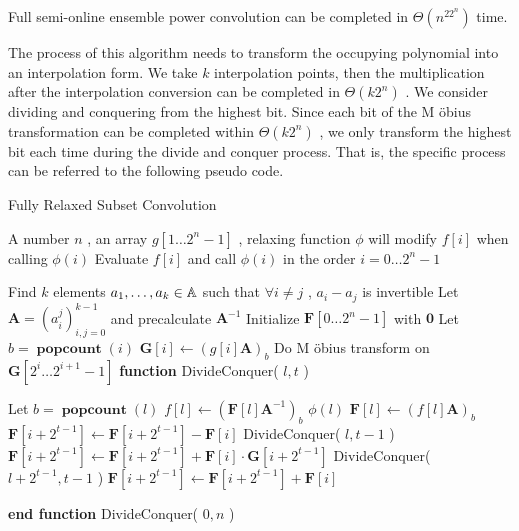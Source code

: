 {\begin { theorem }
Full semi-online ensemble power convolution can be completed in $ \Theta (n^ 22 ^n) $ time.
\end { theorem }

The process of this algorithm needs to transform the occupying polynomial into an interpolation form. We take $ k $ interpolation points, then the multiplication after the interpolation conversion can be completed in $ \Theta (k 2 ^n) $ . We consider dividing and conquering from the highest bit. Since each bit of the M \" obius transformation can be completed within $ \Theta (k 2 ^n) $ , we only transform the highest bit each time during the divide and conquer process. That is, the specific process can be referred to the following pseudo code.

\begin { breakablealgorithm }
  \caption {Fully Relaxed Subset Convolution}
  \begin { algorithmic }[1]
    \REQUIRE A number $ n $ , an array $ g[ 1 \dots  2 ^n- 1 ] $ , relaxing function $ \phi $ will modify $ f[i] $ when calling $ \phi (i) $
    \ENSURE Evaluate $ f[i] $ and call $ \phi (i) $ in the order $ i = 0 \dots  2 ^n- 1 $
   
    \STATE Find $ k $ elements $ a_ 1 , \dots ,a_k \in   \mathbb A $ such that $ \forall i \neq j $ , $ a_i-a_j $ is invertible
    \STATE Let $ \mathbf A = (a_i^j)_{i,j=0}^{k-1} $ and precalculate $ \mathbf A^{-1} $
    \STATE Initialize $ \mathbf F[ 0 \dots  2 ^n- 1 ] $ with $ \mathbf  0 $
      \STATE Let $ b = \operatorname { \mathbf {popcount}}(i) $
      \STATE  $ \mathbf G[i] \leftarrow (g[i] \mathbf A)_b $
    \ENDFOR
      \STATE Do M \" obius transform on $ \mathbf G[ 2 ^i \dots  2 ^{i+1}- 1 ] $
    \ENDFOR
    \STATE  \textbf { function } DivideConquer( $ l, t $ ) \COMMENT {solve $ [l, l+ 2 ^t) $ }
    \begin {ALC@g} %
      \STATE Let $ b = \operatorname { \mathbf {popcount}}(l) $
      \STATE  $ f[l] \leftarrow ( \mathbf F[l] \mathbf A^{-1})_b $ 
      \STATE  $ \phi (l) $
      \STATE  $ \mathbf F[l] \leftarrow (f[l] \mathbf A)_b $
    \ELSE
        \STATE  $ \mathbf F[i + 2 ^{t-1}] \leftarrow  \mathbf F[i + 2 ^{t-1}]- \mathbf F[i] $
      \ENDFOR
      \STATE DivideConquer( $ l, t- 1 $ )
        \STATE  $ \mathbf F[i + 2 ^{t-1}] \leftarrow  \mathbf F[i + 2 ^{t-1}] + \mathbf F[i] \cdot  \mathbf G[i + 2 ^ {t-1}] $
      \ENDFOR
      \STATE DivideConquer( $ l+ 2 ^{t-1}, t- 1 $ )
        \STATE  $ \mathbf F[i + 2 ^{t-1}] \leftarrow  \mathbf F[i + 2 ^{t-1}] + \mathbf F[i] $
      \ENDFOR
    \ENDIF
    \end {ALC@g}
    \STATE  \textbf { end function }
    \STATE DivideConquer( $ 0 , n $ )
  \end { algorithmic }
\end { breakablealgorithm }

}
